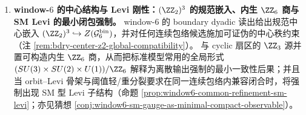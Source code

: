 \begin{enumerate}
  \item \textbf{window-\texorpdfstring{$6$}{6} 的中心结构与 Levi 刚性：\texorpdfstring{$(\ZZ_2)^3$}{(Z2)^3} 的规范嵌入、内生 \texorpdfstring{$\ZZ_6$}{Z6} 商与 SM Levi 的最小闭包强制。}
  window-\(6\) 的 boundary dyadic 读出给出规范中心嵌入 \((\ZZ_2)^3\hookrightarrow Z(\mathcal{G}^{\mathrm{bin}}_6)\)，并对任何连续包络候选施加可证伪的中心秩约束（注 \ref{rem:bdry-center-z2-global-compatibility}）。
  与 cyclic 扇区的 \(\ZZ_3\) 源并置可构造内生 \(\ZZ_6\) 商，从而把标准模型常用的全局形式 \((SU(3)\times SU(2)\times U(1))/\ZZ_6\) 解释为离散输出强制的最小一致性后果；并且当 orbit--Levi 骨架与阈值轻/重分裂要求在同一连续包络内兼容闭合时，将强制出现 SM 型 Levi 子结构（命题 \ref{prop:window6-common-refinement-sm-levi}；亦见猜想 \ref{conj:window6-sm-gauge-as-minimal-compact-observable}）。
\end{enumerate}

